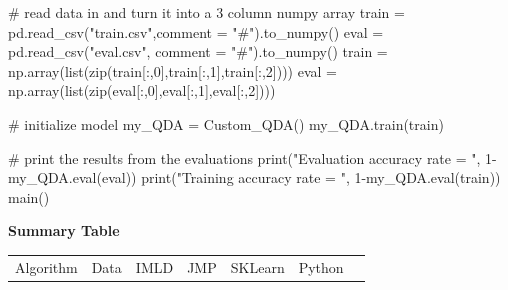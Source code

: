 \documentclass{article}
\begin{document}
\begin{flushleft}
\begin{python}
        # read data in and turn it into a 3 column numpy array
        train = pd.read_csv("train.csv",comment = "#").to_numpy()
        eval = pd.read_csv("eval.csv", comment = "#").to_numpy()
        train = np.array(list(zip(train[:,0],train[:,1],train[:,2])))
        eval = np.array(list(zip(eval[:,0],eval[:,1],eval[:,2])))

        # initialize model
        my_QDA = Custom_QDA()
        my_QDA.train(train)
        
        # print the results from the evaluations
        print("Evaluation accuracy rate = ", 1-my_QDA.eval(eval))
        print("Training accuracy rate = ", 1-my_QDA.eval(train))
main()
\end{python}
\textbf{Summary Table}\break
\break
\begin{tabular}{|c| c| c| c| c| c| c| c| c| c| c|}
\hline
Algorithm & Data & \multicolumn{2}{|c|}{IMLD} & \multicolumn{2}{|c|}{JMP} & \multicolumn{2}{|c|}{SKLearn} & \multicolumn{2}{|c|}{Python}
\hline
\end{tabular}
\end{flushleft}
\end{document}
